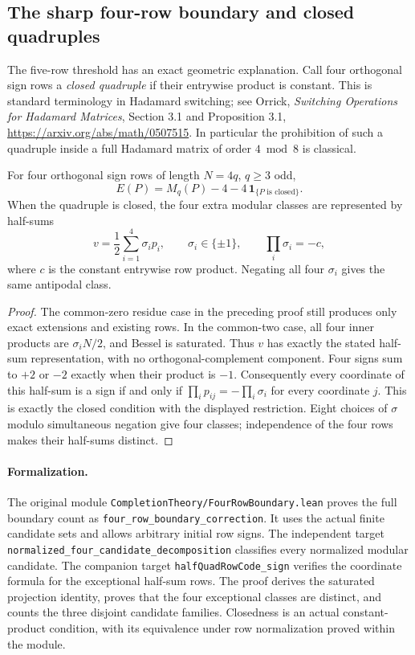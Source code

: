 \subsection{The sharp four-row boundary and closed quadruples}
The five-row threshold has an exact geometric explanation. Call four
orthogonal sign rows a \emph{closed quadruple} if their entrywise
product is constant. This is standard terminology in Hadamard
switching; see Orrick, \emph{Switching Operations for Hadamard
Matrices}, Section 3.1 and Proposition 3.1,
\url{https://arxiv.org/abs/math/0507515}.
In particular the prohibition of such a quadruple inside a full
Hadamard matrix of order $4\bmod8$ is classical.

\begin{proposition}
For four orthogonal sign rows of length $N=4q$, $q\ge3$ odd,
\[
 E(P)=M_q(P)-4-4\,\mathbf1_{\{P\text{ is closed}\}}.
\]
When the quadruple is closed, the four extra modular classes are
represented by half-sums
\[
 v=\frac12\sum_{i=1}^4\sigma_i p_i,
 \qquad\sigma_i\in\{\pm1\},\qquad
 \prod_i\sigma_i=-c,
\]
where $c$ is the constant entrywise row product. Negating all four
$\sigma_i$ gives the same antipodal class.
\end{proposition}
\begin{proof}
The common-zero residue case in the preceding proof still produces
only exact extensions and existing rows. In the common-two case,
all four inner products are $\sigma_iN/2$, and Bessel is saturated.
Thus $v$ has exactly the stated half-sum representation, with no
orthogonal-complement component. Four signs sum to $+2$ or $-2$
exactly when their product is $-1$. Consequently every coordinate
of this half-sum is a sign if and only if
$\prod_i p_{ij}=-\prod_i\sigma_i$ for every coordinate $j$.
This is exactly the closed condition with the displayed restriction.
Eight choices of $\sigma$ modulo simultaneous negation give four
classes; independence of the four rows makes their half-sums distinct.
\end{proof}

\paragraph{Formalization.}
The original module
\texttt{CompletionTheory/\allowbreak FourRowBoundary.lean}
proves the full boundary count as
\texttt{four\_\allowbreak row\_\allowbreak boundary\_\allowbreak correction}.
It uses the actual finite candidate sets and allows arbitrary initial
row signs. The independent target
\texttt{normalized\_\allowbreak four\_\allowbreak candidate\_\allowbreak decomposition}
classifies every normalized modular candidate. The companion target
\texttt{halfQuadRowCode\_\allowbreak sign}
verifies the coordinate formula for the exceptional half-sum rows.
The proof derives the saturated projection identity, proves that the
four exceptional classes are distinct, and counts the three disjoint
candidate families. Closedness is an actual constant-product condition,
with its equivalence under row normalization proved within the module.


